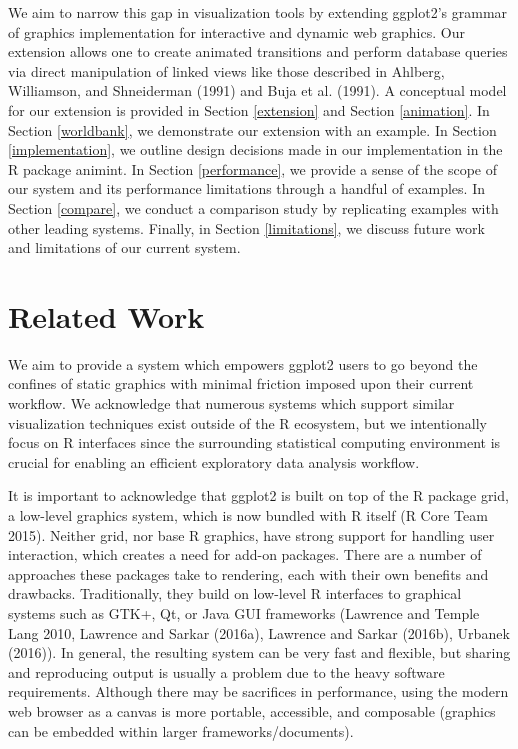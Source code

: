 \documentclass[12pt,]{article}
\theoremstyle{definition}
\theoremstyle{definition}
\theoremstyle{remark}
\begin{document}
We aim to narrow this gap in visualization tools by extending ggplot2's
grammar of graphics implementation for interactive and dynamic web
graphics. Our extension allows one to create animated transitions and
perform database queries via direct manipulation of linked views like
those described in Ahlberg, Williamson, and Shneiderman (1991) and Buja
et al. (1991). A conceptual model for our extension is provided in
Section \ref{extension} and Section \ref{animation}. In Section
\ref{worldbank}, we demonstrate our extension with an example. In
Section \ref{implementation}, we outline design decisions made in our
implementation in the R package animint. In Section \ref{performance},
we provide a sense of the scope of our system and its performance
limitations through a handful of examples. In Section \ref{compare}, we
conduct a comparison study by replicating examples with other leading
systems. Finally, in Section \ref{limitations}, we discuss future work
and limitations of our current system.

\section{Related Work}\label{related-work}

We aim to provide a system which empowers ggplot2 users to go beyond the
confines of static graphics with minimal friction imposed upon their
current workflow. We acknowledge that numerous systems which support
similar visualization techniques exist outside of the R ecosystem, but
we intentionally focus on R interfaces since the surrounding statistical
computing environment is crucial for enabling an efficient exploratory
data analysis workflow.

It is important to acknowledge that ggplot2 is built on top of the R
package grid, a low-level graphics system, which is now bundled with R
itself (R Core Team 2015). Neither grid, nor base R graphics, have
strong support for handling user interaction, which creates a need for
add-on packages. There are a number of approaches these packages take to
rendering, each with their own benefits and drawbacks. Traditionally,
they build on low-level R interfaces to graphical systems such as GTK+,
Qt, or Java GUI frameworks (Lawrence and Temple Lang 2010, Lawrence and
Sarkar (2016a), Lawrence and Sarkar (2016b), Urbanek (2016)). In
general, the resulting system can be very fast and flexible, but sharing
and reproducing output is usually a problem due to the heavy software
requirements. Although there may be sacrifices in performance, using the
modern web browser as a canvas is more portable, accessible, and
composable (graphics can be embedded within larger
frameworks/documents).
\end{document}
